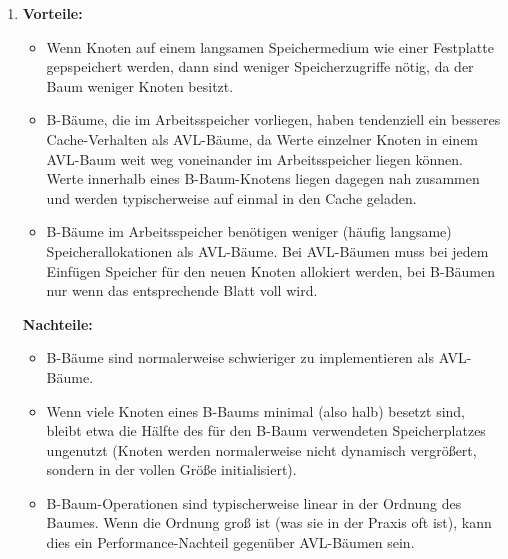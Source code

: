 \documentclass[11pt,a4paper]{article}
\begin{document}
\begin{loesung}
    \begin{enumerate}
        \item
        \textbf{Vorteile:}
        \begin{itemize}
            \item Wenn Knoten auf einem langsamen Speichermedium wie einer Festplatte gepspeichert werden, dann sind weniger Speicherzugriffe nötig, da der Baum weniger Knoten besitzt.
            \item B-Bäume, die im Arbeitsspeicher vorliegen, haben tendenziell ein besseres Cache-Verhalten als AVL-Bäume, da Werte einzelner Knoten in einem AVL-Baum weit weg voneinander im Arbeitsspeicher liegen können.
            Werte innerhalb eines B-Baum-Knotens liegen dagegen nah zusammen und werden typischerweise auf einmal in den Cache geladen.
            \item B-Bäume im Arbeitsspeicher benötigen weniger (häufig langsame) Speicherallokationen als AVL-Bäume.
            Bei AVL-Bäumen muss bei jedem Einfügen Speicher für den neuen Knoten allokiert werden, bei B-Bäumen nur wenn das entsprechende Blatt voll wird.
        \end{itemize}

        \textbf{Nachteile:}
        \begin{itemize}
            \item B-Bäume sind normalerweise schwieriger zu implementieren als AVL-Bäume.
            \item Wenn viele Knoten eines B-Baums minimal (also halb) besetzt sind, bleibt etwa die Hälfte des für den B-Baum verwendeten Speicherplatzes ungenutzt (Knoten werden normalerweise nicht dynamisch vergrößert, sondern in der vollen Größe initialisiert).
            \item B-Baum-Operationen sind typischerweise linear in der Ordnung des Baumes. Wenn die Ordnung groß ist (was sie in der Praxis oft ist), kann dies ein Performance-Nachteil gegenüber AVL-Bäumen sein.
        \end{itemize}


\end{enumerate}
\end{loesung}
\end{document}
